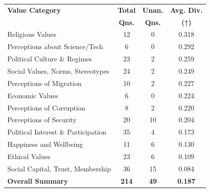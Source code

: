 \begin{tabularx}{\columnwidth}{@{} X c c c @{}}
\toprule
\textbf{Value Category} & \textbf{Total} & \textbf{Unan.} & \textbf{Avg. Div.} \\
& \textbf{Qns.} & \textbf{Qns.} & \textbf{(↑)} \\
\midrule
Religious Values & 12 & 0 & 0.318 \\
Perceptions about Science/Tech & 6 & 0 & 0.292 \\
Political Culture \& Regimes & 23 & 2 & 0.259 \\
Social Values, Norms, Stereotypes & 24 & 2 & 0.249 \\
Perceptions of Migration & 10 & 2 & 0.227 \\
Economic Values & 6 & 0 & 0.224 \\
Perceptions of Corruption & 8 & 2 & 0.220 \\
Perceptions of Security & 20 & 10 & 0.204 \\
Political Interest \& Participation & 35 & 4 & 0.173 \\
Happiness and Wellbeing & 11 & 6 & 0.130 \\
Ethical Values & 23 & 6 & 0.109 \\
Social Capital, Trust, Membership & 36 & 15 & 0.084 \\
\midrule
\textbf{Overall Summary} & \textbf{214} & \textbf{49} & \textbf{0.187} \\
\bottomrule
\end{tabularx}
